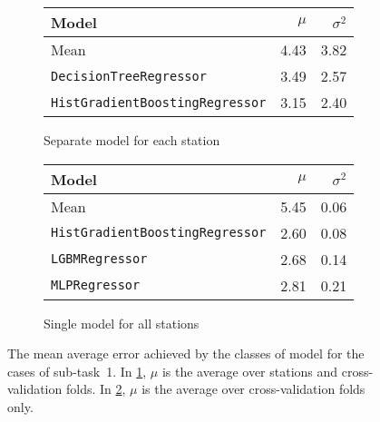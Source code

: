 \documentclass[11pt]{extarticle}
\begin{document}
\begin{figure}
  \centering
  \begin{subfigure}{\textwidth}
    \centering
    \begin{tabular}{lrr}
      \toprule
      Model                                  & $\mu$ & $\sigma^2$
      \\
      \midrule
      Mean                                   & 4.43  & 3.82
      \\
      \texttt{DecisionTreeRegressor}         & 3.49  & 2.57
      \\
      \texttt{HistGradientBoostingRegressor} & 3.15  & 2.40
      \\
      \bottomrule
    \end{tabular}
    \caption{Separate model for each station}
    \label{fig:chart-subtask-1-1}
  \end{subfigure}
  \par\bigskip\bigskip
  \begin{subfigure}{\textwidth}
    \centering
    \begin{tabular}{lrr}
      \toprule
      Model                                  & $\mu$ & $\sigma^2$
      \\
      \midrule
      Mean                                   & 5.45  & 0.06
      \\
      \texttt{HistGradientBoostingRegressor} & 2.60  & 0.08
      \\
      \texttt{LGBMRegressor}                 & 2.68  & 0.14
      \\
      \texttt{MLPRegressor}                  & 2.81  & 0.21
      \\
      \bottomrule
    \end{tabular}
    \caption{Single model for all stations}
    \label{fig:chart-subtask-1-2}
  \end{subfigure}
  \caption{The mean average error achieved by the classes of model for the cases of sub-task~1.
    In \cref{fig:chart-subtask-1-1}, $\mu$ is the average over stations and cross-validation folds.
    In \cref{fig:chart-subtask-1-2}, $\mu$ is the average over cross-validation folds only.
  }
  \label{fig:chart-subtask-1}
\end{figure}

\printbibliography
\end{document}
